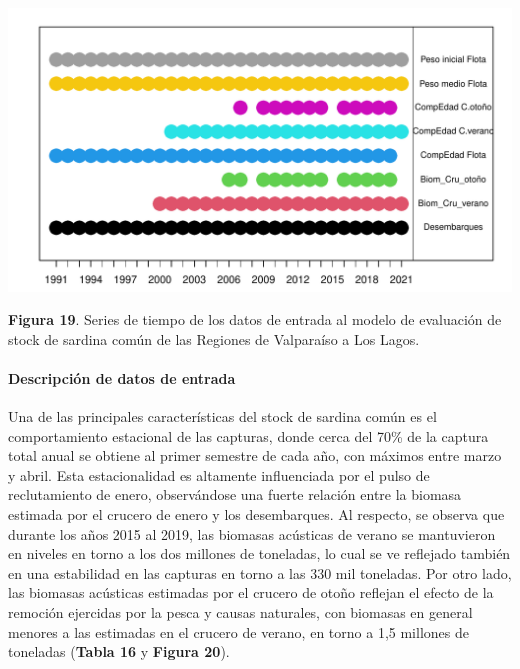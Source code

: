 \documentclass[
  spanish,
]{article}
\begin{document}
\vspace{-0.2cm}

\begin{center}\includegraphics{FigurasInforme_Marzo/F19_datos-1} \end{center}

\vspace{-0.5cm}
\small

\textbf{Figura 19}. Series de tiempo de los datos de entrada al modelo
de evaluación de stock de sardina común de las Regiones de Valparaíso a
Los Lagos. \vspace{0.5cm} \normalsize

\hypertarget{descripciuxf3n-de-datos-de-entrada}{%
\paragraph{Descripción de datos de
entrada}\label{descripciuxf3n-de-datos-de-entrada}}

\quad

Una de las principales características del stock de sardina común es el
comportamiento estacional de las capturas, donde cerca del 70\% de la
captura total anual se obtiene al primer semestre de cada año, con
máximos entre marzo y abril. Esta estacionalidad es altamente
influenciada por el pulso de reclutamiento de enero, observándose una
fuerte relación entre la biomasa estimada por el crucero de enero y los
desembarques. Al respecto, se observa que durante los años 2015 al 2019,
las biomasas acústicas de verano se mantuvieron en niveles en torno a
los dos millones de toneladas, lo cual se ve reflejado también en una
estabilidad en las capturas en torno a las 330 mil toneladas. Por otro
lado, las biomasas acústicas estimadas por el crucero de otoño reflejan
el efecto de la remoción ejercidas por la pesca y causas naturales, con
biomasas en general menores a las estimadas en el crucero de verano, en
torno a 1,5 millones de toneladas (\textbf{Tabla 16} y \textbf{Figura
20}).
\end{document}
